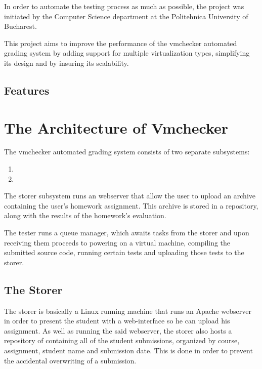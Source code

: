 In order to automate the testing process as much as possible, the \project project 
was initiated by the Computer Science department at the Politehnica 
University of Bucharest.

This project aims to improve the performance of the vmchecker automated grading
system by adding support for multiple virtualization types, simplifying its
design and by insuring its scalability.


\subsection{Features}
\label{sub-sec:vmc-history-features}


\section{The Architecture of Vmchecker}
\label{sec:vmc-architecture}

The vmchecker automated grading system consists of two separate subsystems:
\begin{enumerate}
\item {}
\item {}
\end{enumerate}

\begin{center}
\end{center}

The storer subsystem runs an webserver that allow the user to upload an archive
containing the user's homework assignment. This archive is stored in a repository,
along with the results of the homework's evaluation.

The tester runs a queue manager, which awaits tasks from the storer and upon
receiving them proceeds to powering on a virtual machine, compiling the submitted
source code, running certain tests and uploading those tests to the storer.


\subsection{The Storer}
\label{sub-sec:storer}

The storer is basically a Linux running machine that runs an Apache webserver
in order to present the student with a web-interface so he can upload his
assignment. As well as running the said webserver, the storer also hosts a 
repository of containing all of the student submissions, organized by course,
assignment, student name and submission date. This is done in order to prevent
the accidental overwriting of a submission.

